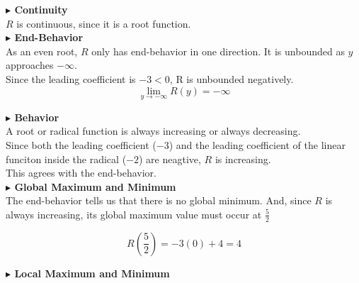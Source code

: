 \documentclass{ximera}
\begin{document}
\begin{example}
\textbf{\textcolor{blue!55!black}{$\blacktriangleright$ Continuity}} \\

$R$ is continuous, since it is a root function. \\






\textbf{\textcolor{blue!55!black}{$\blacktriangleright$ End-Behavior}} \\


As an even root, $R$ only has end-behavior in one direction. It is unbounded as $y$ approaches $-\infty$. \\

Since the leading coefficient is $-3 < 0$, R is unbounded negatively. \\


\[
\lim\limits_{y \to -\infty} R(y) = -\infty
\]












\textbf{\textcolor{blue!55!black}{$\blacktriangleright$ Behavior}} \\


A root or radical function is always increasing or always decreasing. \\


Since both the leading coefficient ($-3$) and the leading coefficient of the linear funciton inside the radical ($-2$) are neagtive, $R$ is increasing. \\

This agrees with the end-behavior. \\






\textbf{\textcolor{blue!55!black}{$\blacktriangleright$ Global Maximum and Minimum}} \\



The end-behavior tells us that there is no global minimum. And, since $R$ is always increasing, its global maximum value must occur at $\frac{5}{2}$


\[
R\left( \frac{5}{2}\right) = -3 (0) + 4 = 4
\]









\textbf{\textcolor{blue!55!black}{$\blacktriangleright$ Local Maximum and Minimum}} \\




\end{example}
\end{document}
